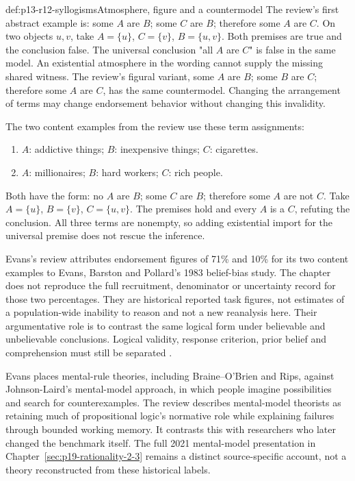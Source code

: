 \begin{hbexample}{def:p13-r12-syllogisms}{Atmosphere, figure and a countermodel}
The review's first abstract example is:
some \(A\) are \(B\); some \(C\) are \(B\); therefore some \(A\)
are \(C\).  On two objects \(u,v\), take
\(A=\{u\}\), \(C=\{v\}\), \(B=\{u,v\}\).
Both premises are true and the conclusion false.  The universal conclusion
"all \(A\) are \(C\)" is false in the same model.
An existential atmosphere in the wording cannot supply the missing shared
witness.  The review's figural variant, some \(A\) are \(B\); some
\(B\) are \(C\); therefore some \(A\) are \(C\), has the same
countermodel.  Changing the arrangement of terms may change endorsement
behavior without changing this invalidity.

The two content examples from the review use these term assignments:
\begin{enumerate}
 \item \(A\): addictive things; \(B\): inexpensive things; \(C\): cigarettes.
 \item \(A\): millionaires; \(B\): hard workers; \(C\): rich people.
\end{enumerate}
Both have the form: no \(A\) are \(B\); some \(C\) are \(B\);
therefore some \(A\) are not \(C\).  Take
\(A=\{u\}\), \(B=\{v\}\), \(C=\{u,v\}\).
The premises hold and every \(A\) is a \(C\), refuting the conclusion.
All three terms are nonempty, so adding existential import for the universal
premise does not rescue the inference.
\end{hbexample}

Evans's review attributes endorsement figures of 71\% and 10\% for its two
content examples to Evans, Barston and Pollard's 1983 belief-bias study.
The chapter does not reproduce the full recruitment, denominator or uncertainty
record for those two percentages.  They are historical reported task figures,
not estimates of a population-wide inability to reason and not a new reanalysis
here.  Their argumentative role is to contrast the same logical form under
believable and unbelievable conclusions.  Logical validity, response criterion,
prior belief and comprehension must still be separated
\parencite[p.~88]{Evans2021RationalityDebate}.

Evans places mental-rule theories, including Braine--O'Brien and Rips, against
Johnson-Laird's mental-model approach, in which people imagine possibilities
and search for counterexamples.  The review describes mental-model theorists
as retaining much of propositional logic's normative role while explaining
failures through bounded working memory.  It contrasts this with researchers
who later changed the benchmark itself.  The full 2021 mental-model presentation
in Chapter~\ref{sec:p19-rationality-2-3} remains a distinct source-specific
account, not a theory reconstructed from these historical labels.

